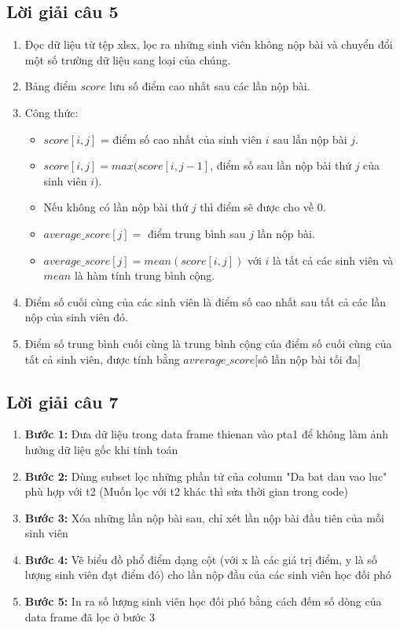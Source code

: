 \documentclass[a4paper]{article}
\theoremstyle{definition}
\begin{document}
\subsection{Lời giải câu 5}
\begin{enumerate}
    \item Đọc dữ liệu từ tệp xlsx, lọc ra những sinh viên không nộp bài và chuyển đổi một số trường dữ liệu sang loại của chúng.
    \item Bảng điểm $score$ lưu số điểm cao nhất sau các lần nộp bài.
    \item Công thức: 
    \begin{itemize}
        \item $score[i, j]$ = điểm số cao nhất của sinh viên $i$ sau lần nộp bài $j$.
        \item  $score[i, j] = max(score[i, j - 1]$,  điểm số sau lần nộp bài thứ $j$ của sinh viên $i$).
        \item Nếu không có lần nộp bài thứ $j$ thì điểm sẽ được cho về 0.
        \item $average\_score[j] =$ điểm trung bình sau $j$ lần nộp bài.
        \item $average\_score[j] = mean(score[i, j])$ với $i$ là tất cả các sinh viên và $mean$ là hàm tính trung bình cộng.
    \end{itemize}
    \item Điểm số cuối cùng của các sinh viên là điểm số cao nhất sau tất cả các lần nộp của sinh viên đó.
    \item Điểm số trung bình cuối cùng là trung bình cộng của điểm số cuối cùng của tất cả sinh viên, được tính bằng $avrerage\_score[$sô lần nộp bài tối đa$]$
\end{enumerate}
\subsection{Lời giải câu 7}
\begin{enumerate}
    \item \textbf{Bước 1:} Đưa dữ liệu trong data frame thienan vào pta1 để không làm ảnh hưởng dữ liệu gốc khi tính toán
    \item \textbf{Bước 2:} Dùng subset lọc những phần tử của column "Da bat dau vao luc" phù hợp với t2 (Muốn lọc với t2 khác thì sửa thời gian trong code)
    \item \textbf{Bước 3:} Xóa những lần nộp bài sau, chỉ xét lần nộp bài đầu tiên của mỗi sinh viên
    \item \textbf{Bước 4:} Vẽ biểu đồ phổ điểm dạng cột (với x là các giá trị điểm, y là số lượng sinh viên đạt điểm đó) cho lần nộp đầu của các sinh viên học đối phó
    \item \textbf{Bước 5:} In ra số lượng sinh viên học đối phó bằng cách đếm số dòng của data frame đã lọc ở bước 3
\end{enumerate}
\end{document}
